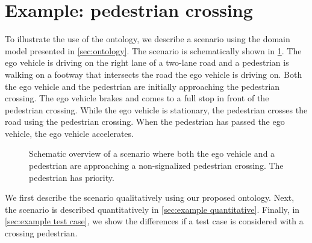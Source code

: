 \section{Example: pedestrian crossing}
\label{sec:example}

To illustrate the use of the ontology, we describe a scenario using the domain model presented in \cref{sec:ontology}. The scenario is schematically shown in \cref{fig:scenario overview}. The ego vehicle is driving on the right lane of a two-lane road and a pedestrian is walking on a footway that intersects the road the ego vehicle is driving on. Both the ego vehicle and the pedestrian are initially approaching the pedestrian crossing. The ego vehicle brakes and comes to a full stop in front of the pedestrian crossing. While the ego vehicle is stationary, the pedestrian crosses the road using the pedestrian crossing. When the pedestrian has passed the ego vehicle, the ego vehicle accelerates.

\setlength{\figurewidth}{0.5\linewidth}
\begin{figure}
	\centering
	
	\caption{Schematic overview of a scenario where both the ego vehicle and a pedestrian are approaching a non-signalized pedestrian crossing. The pedestrian has priority. 
	}
	\label{fig:scenario overview}
\end{figure}


\cbstart
We first describe the scenario qualitatively using our proposed ontology. Next, the scenario is described quantitatively in \cref{sec:example quantitative}. Finally, in \cref{sec:example test case}, we show the differences if a test case is considered with a crossing pedestrian.

